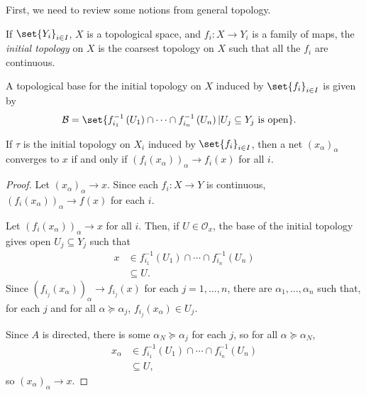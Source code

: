 \documentclass[10pt]{mypackage}
\begin{document}
First, we need to review some notions from general topology.
\begin{definition}
  If $\set{Y_i}_{i\in I}$, $X$ is a topological space, and $f_i\colon X \rightarrow Y_i$ is a family of maps, the \textit{initial topology} on $X$ is the coarsest topology on $X$ such that all the $f_i$ are continuous.\newline

  A topological base for the initial topology on $X$ induced by $\set{f_i}_{i\in I}$ is given by
  \begin{align*}
    \mathcal{B} &= \set{f_{i_1}^{-1}\left( U_1 \right)\cap\cdots\cap f_{i_n}^{-1}\left( U_n \right) | U_j\subseteq Y_j\text{ is open}}.
  \end{align*}
\end{definition}
\begin{proposition}
  If $\tau$ is the initial topology on $X_i$ induced by $\set{f_i}_{i\in I}$, then a net $\left( x_{\alpha} \right)_{\alpha}$ converges to $x$ if and only if $\left( f_i\left( x_{\alpha} \right) \right)_{\alpha}\rightarrow f_i\left( x \right)$ for all $i$.
\end{proposition}
\begin{proof}
  Let $\left( x_{\alpha} \right)_{\alpha}\rightarrow x$. Since each $f_i\colon X\rightarrow Y$ is continuous, $\left( f_i\left( x_{\alpha} \right) \right)_{\alpha}\rightarrow f(x)$ for each $i$.\newline

  Let $\left( f_i\left( x_{\alpha} \right) \right)_{\alpha}\rightarrow x$ for all $i$. Then, if $U\in \mathcal{O}_{x}$, the base of the initial topology gives open $U_j\subseteq Y_j$ such that
  \begin{align*}
    x &\in f_{i_1}^{-1}\left( U_1 \right)\cap\cdots\cap f_{i_n}^{-1}\left( U_n \right)\\
      &\subseteq U.
  \end{align*}
  Since $\left( f_{i_j}\left( x_{\alpha} \right) \right)_{\alpha}\rightarrow f_{i_j}\left( x \right)$ for each $j=1,\dots,n$, there are $\alpha_1,\dots,\alpha_n$ such that, for each $j$ and for all $\alpha\succeq \alpha_j$, $f_{i_j}\left( x_{\alpha} \right)\in U_j$.

  Since $A$ is directed, there is some $\alpha_N\succeq \alpha_j$ for each $j$, so for all $\alpha\succeq \alpha_N$,
  \begin{align*}
    x_{\alpha} &\in f_{i_1}^{-1}\left( U_1 \right)\cap\cdots\cap f_{i_n}^{-1}\left( U_n \right)\\
               &\subseteq U,
  \end{align*}
  so $\left( x_{\alpha} \right)_{\alpha}\rightarrow x$.
\end{proof}
\end{document}
